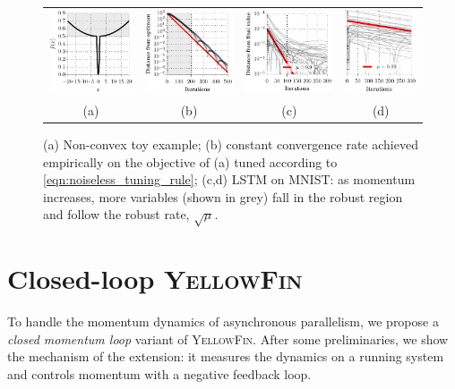 \documentclass{article}
\newcommand{\tuner}{\textsc{YellowFin}\xspace}
\newcommand{\Asynctuner}{Closed-loop \textsc{YellowFin}\xspace}
\begin{document}
\begin{figure}[t]
\centering
\begin{tabular}{c c c c}
  \includegraphics[width=0.23\linewidth]{figures/non_convex_toy} &
  \includegraphics[width=0.24\linewidth]{figures/non_convex_constant_rate} &
  \includegraphics[width=0.24\linewidth]{figures/constant_rate_09} &
  \includegraphics[width=0.19\linewidth]{figures/constant_rate_099} \\
  (a) & (b) & (c) &(d)
\end{tabular}
\caption{(a) Non-convex toy example;
(b) constant convergence rate achieved empirically on the objective of (a) tuned according to \eqref{eqn:noiseless_tuning_rule};
(c,d)
LSTM on MNIST: as momentum increases, more variables (shown in grey) fall in the robust region and follow the robust rate, $\sqrt{\mu}$.}
\label{fig:curvature_robustness}
\end{figure}














\section{\Asynctuner}
\label{sec:async_tuner}
To handle the momentum dynamics of asynchronous parallelism, we propose a {\em closed momentum loop} variant of \tuner.
After some preliminaries, we show the mechanism of the extension: 
it measures the dynamics on a running system and controls momentum with a negative feedback loop.
\end{document}
